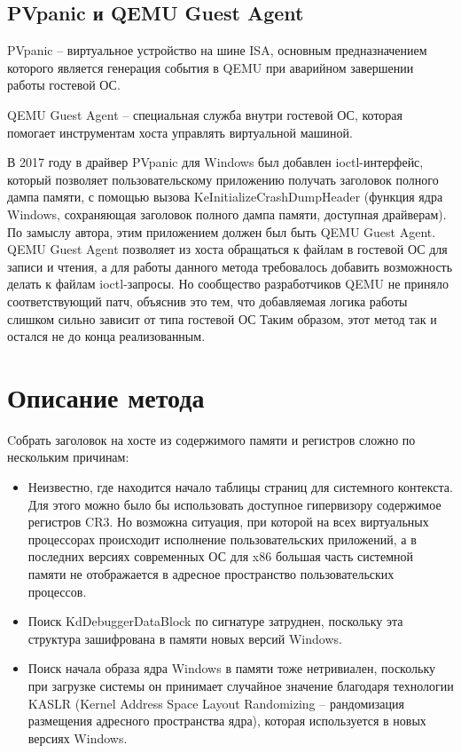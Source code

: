 \documentclass{mipt-thesis-bs}
\begin{document}
\newpage
\section*{PVpanic и QEMU Guest Agent}

PVpanic -- виртуальное устройство на шине ISA, основным предназначением которого является генерация события в QEMU при аварийном завершении работы гостевой ОС.

QEMU Guest Agent -- специальная служба внутри гостевой ОС, которая помогает инструментам хоста управлять виртуальной машиной.

В 2017 году в драйвер PVpanic для Windows был добавлен ioctl-интерфейс, который позволяет пользовательскому приложению получать заголовок полного дампа памяти, с помощью вызова KeInitializeCrashDumpHeader (функция ядра Windows, сохраняющая заголовок полного дампа памяти, доступная драйверам\cite{kicdh}). По замыслу автора, этим приложением должен был быть QEMU Guest Agent\cite{qgaioctl}. QEMU Guest Agent позволяет из хоста обращаться к файлам в гостевой ОС для записи и чтения, а для работы данного метода требовалось добавить возможность делать к файлам ioctl-запросы. Но сообщество разработчиков QEMU не приняло соответствующий патч, объяснив это тем, что добавляемая логика работы слишком сильно зависит от типа гостевой ОС
Таким образом, этот метод так и остался не до конца реализованным.

\chapter{Описание метода}

Cобрать заголовок на хосте из содержимого памяти и регистров сложно по нескольким причинам:

\begin{itemize}
\item Неизвестно, где находится начало таблицы страниц для системного контекста. Для этого можно было бы использовать доступное гипервизору содержимое регистров CR3. Но возможна ситуация, при которой на всех виртуальных процессорах происходит исполнение пользовательских приложений, а в последних версиях современных ОС для x86 большая часть системной памяти не отображается в адресное пространство пользовательских процессов.
\item Поиск KdDebuggerDataBlock по сигнатуре затруднен, поскольку эта структура зашифрована в памяти новых версий Windows\cite{kdbgenc}.
\item Поиск начала образа ядра Windows в памяти тоже нетривиален, поскольку при загрузке системы он принимает случайное значение благодаря технологии KASLR (Kernel Address Space Layout Randomizing -- рандомизация размещения адресного пространства ядра), которая используется в новых версиях Windows.
\end{itemize}
\end{document}
